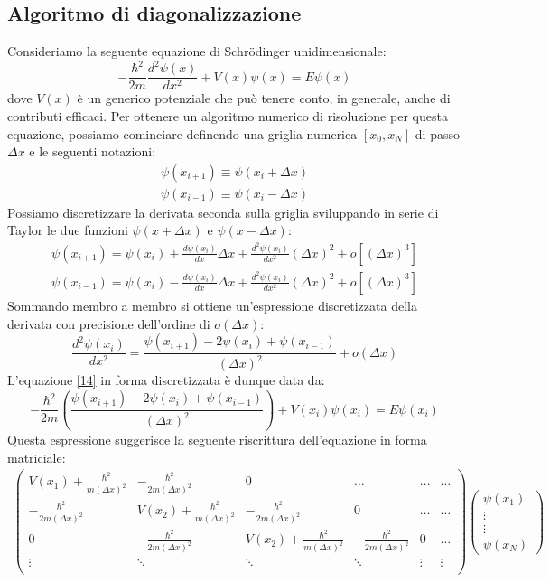 \documentclass[11pt,a4paper]{article}
\begin{document}
\subsection{Algoritmo di diagonalizzazione}
Consideriamo la seguente equazione di Schr\"{o}dinger unidimensionale:
\begin{equation}\label{14}
-\frac{\hbar^2}{2m}\frac{d^2\psi(x)}{dx^2} + V(x)\psi(x)=E\psi(x)
\end{equation}
dove $V(x)$ è un generico potenziale che può tenere conto, in generale, anche di contributi efficaci. Per ottenere un algoritmo numerico di risoluzione per questa equazione, possiamo cominciare definendo una griglia numerica $[x_0,x_N]$ di passo $\Delta x$ e le seguenti notazioni:
\begin{align*}
\psi(x_{i+1}) \equiv \psi(x_i + \Delta x)  \\
\psi(x_{i-1}) \equiv \psi(x_i - \Delta x)
\end{align*}
Possiamo discretizzare la derivata seconda sulla griglia sviluppando in serie di Taylor le due funzioni $\psi(x+\Delta x)$ e $\psi(x-\Delta x)$:
\begin{align*}
\psi(x_{i+1}) = \psi(x_i) + \frac{d\psi(x_i)}{dx}\Delta x + \frac{d^2 \psi(x_i)}{dx^2}(\Delta x)^2 + o[(\Delta x)^3] \\
\psi(x_{i-1}) = \psi(x_i) - \frac{d\psi(x_i)}{dx}\Delta x + \frac{d^2 \psi(x_i)}{dx^2}(\Delta x)^2 + o[(\Delta x)^3]
\end{align*}
Sommando membro a membro si ottiene un'espressione discretizzata della derivata con precisione dell'ordine di $o(\Delta x)$:
\begin{equation}
\frac{d^2 \psi(x_i)}{dx^2} = \frac{\psi(x_{i+1}) - 2\psi(x_i) + \psi(x_{i-1})}{(\Delta x)^2} + o(\Delta x)
\end{equation}
L'equazione \eqref{14} in forma discretizzata è dunque data da:
\begin{equation}
-\frac{\hbar^2}{2m} \left( \frac{\psi(x_{i+1}) - 2\psi(x_i) + \psi(x_{i-1})}{(\Delta x)^2} \right) + V(x_i)\psi(x_i) = E\psi(x_i)
\end{equation}
Questa espressione suggerisce la seguente riscrittura dell'equazione in forma matriciale:
\[
\begin{split}
\left( \begin{array}{cccccc}
V(x_1) + \frac{\hbar^2}{m(\Delta x)^2} & -\frac{\hbar^2}{2m(\Delta x)^2} & 0 & \ldots & \ldots & \ldots  \\
-\frac{\hbar^2}{2m(\Delta x)^2} & V(x_2) + \frac{\hbar^2}{m(\Delta x)^2} & -\frac{\hbar^2}{2m(\Delta x)^2} & 0 & \ldots & \ldots \\
0 & -\frac{\hbar^2}{2m(\Delta x)^2} & V(x_2) + \frac{\hbar^2}{m(\Delta x)^2} & -\frac{\hbar^2}{2m(\Delta x)^2} & 0 & \ldots \\
\vdots & \ddots & \ddots & \ddots & \vdots & \vdots \\
\end{array}\right) 
\left( \begin{array}{c}
\psi(x_1) \\ \vdots \\ \vdots \\ \psi(x_N)
\end{array} \right)  
\end{split}
\]
\end{document}
